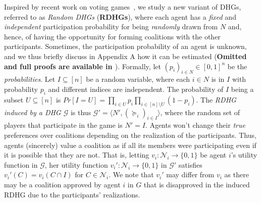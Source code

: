 \documentclass[letterpaper]{article} %
\begin{document}
Inspired by recent work on voting games~\cite{imber2021probabilistic}, %
we study a new variant of DHGs, referred to as \textit{Random DHGs} (\textbf{RDHGs}), where each agent has a \textit{fixed} and \textit{independent} participation probability for being \textit{randomly} drawn from $N$ and, hence, of having the opportunity for forming coalitions with the other participants. Sometimes, the participation probability of an agent is unknown, and we thus briefly discuss in Appendix A how it can be estimated (\textbf{Omitted and full proofs are available in \cite{supplementary}}). %
Formally, let $(p_i)_{i \in N} \in [0,1]^n$ be the \textit{probabilities}. Let $I \subseteq [n]$ be a random variable, where each $i \in N$ is in $I$ with probability $p_i$ and different indices are independent. The probability of $I$ being a subset $U \subseteq [n]$ is $Pr[I = U] = \prod_{i \in U} p_i \prod_{i \in [n] \setminus U} (1-p_i)$. The \textit{RDHG induced by a DHG $\mathcal{G}$} is thus $\mathcal{G}' = \langle N', (\succeq_i)_{i \in I} \rangle$, where the random set of players that participate in the game is $N' = I$. Agents won’t change their \textit{true} preferences over coalitions depending on the realization of the participants. Thus, agents (sincerely) value a coalition as if all its members were participating even if it is possible that they are not. That is, letting $v_i: \mathcal{N}_i \rightarrow \{0,1\}$ be agent $i$'s utility function in $\mathcal{G}$, her utility function $v_i': \mathcal{N}_i \rightarrow \{0,1\}$ in $\mathcal{G}'$ satisfies $v_i'(C) = v_i(C \cap I)$ for $C \in \mathcal{N}_i$. We note that $v_i'$ may differ from $v_i$ as there may be a coalition approved by agent $i$ in $G$ that is disapproved in the induced RDHG due to the participants' realizations.
%
\end{document}
